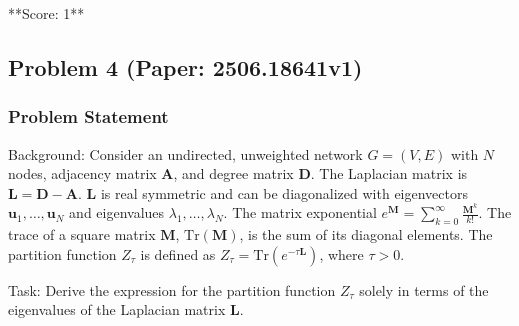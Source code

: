\documentclass[10pt]{article}
\begin{document}
**Score: 1**

\newpage
\subsection*{Problem 4 (Paper: 2506.18641v1)}
\subsubsection*{Problem Statement}
Background:
Consider an undirected, unweighted network $G=(V,E)$ with $N$ nodes, adjacency matrix $\mathbf{A}$, and degree matrix $\mathbf{D}$. The Laplacian matrix is $\mathbf{L = D - A}$. $\mathbf{L}$ is real symmetric and can be diagonalized with eigenvectors $\mathbf{u}_1, \dots, \mathbf{u}_N$ and eigenvalues $\lambda_1, \dots, \lambda_N$. The matrix exponential $e^{\mathbf{M}} = \sum_{k=0}^{\infty} \frac{\mathbf{M}^k}{k!}$. The trace of a square matrix $\mathbf{M}$, $\text{Tr}(\mathbf{M})$, is the sum of its diagonal elements. The partition function $Z_{\tau}$ is defined as $Z_{\tau} = \text{Tr}(e^{-\tau \mathbf{L}})$, where $\tau > 0$.

Task:
Derive the expression for the partition function $Z_{\tau}$ solely in terms of the eigenvalues of the Laplacian matrix $\mathbf{L}$.
\end{document}
